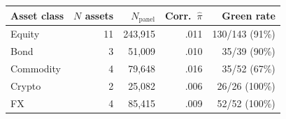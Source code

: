 \begin{tabular}{@{}lrrrr@{}}
\toprule
Asset class & $N$ assets & $N_{\text{panel}}$
& Corr.\ $\hat\pi$ & Green rate \\
\midrule
Equity     & 11 & 243{,}915 & .011
& 130/143 (91\%) \\
Bond       &  3 & 51{,}009 & .010
& 35/39 (90\%) \\
Commodity  &  4 & 79{,}648 & .016
& 35/52 (67\%) \\
Crypto     &  2 & 25{,}082 & .006
& 26/26 (100\%) \\
FX         &  4 & 85{,}415 & .009
& 52/52 (100\%) \\
\bottomrule
\end{tabular}

